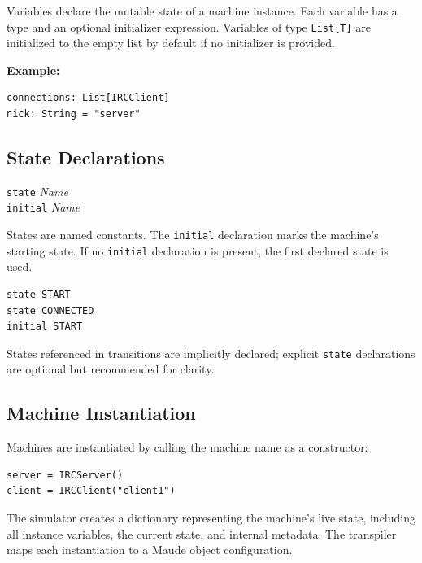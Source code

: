 \documentclass[11pt,letterpaper]{article}
\begin{document}
Variables declare the mutable state of a machine instance.  Each variable
has a type and an optional initializer expression.  Variables of type
\texttt{List[T]} are initialized to the empty list by default if no
initializer is provided.

\textbf{Example:}
\begin{lstlisting}[numbers=none]
connections: List[IRCClient]
nick: String = "server"
\end{lstlisting}

\subsection{State Declarations}

\begin{syntaxbox}
\texttt{state} \textit{Name} \\
\texttt{initial} \textit{Name}
\end{syntaxbox}

States are named constants.  The \lstinline{initial} declaration marks
the machine's starting state.  If no \lstinline{initial} declaration is
present, the first declared state is used.

\begin{lstlisting}[numbers=none]
state START
state CONNECTED
initial START
\end{lstlisting}

\begin{notebox}
States referenced in transitions are implicitly declared; explicit
\lstinline{state} declarations are optional but recommended for clarity.
\end{notebox}

\subsection{Machine Instantiation}

Machines are instantiated by calling the machine name as a constructor:

\begin{lstlisting}[numbers=none]
server = IRCServer()
client = IRCClient("client1")
\end{lstlisting}

The simulator creates a dictionary representing the machine's live state,
including all instance variables, the current state, and internal
metadata.  The transpiler maps each instantiation to a Maude object
configuration.


\end{document}
